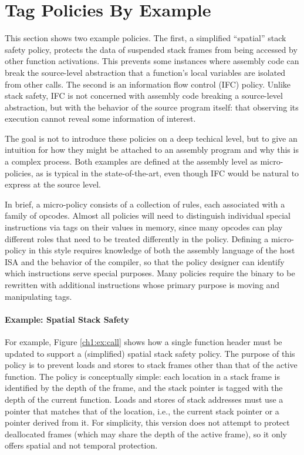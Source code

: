 \section{Tag Policies By Example}

This section shows two example policies. The first, a simplified ``spatial''
stack safety policy, protects the data of suspended stack frames from being accessed by
other function activations. This prevents some instances where assembly
code can break the source-level abstraction that a function's local variables are isolated
from other calls. The second is an information flow control (IFC) policy. Unlike stack safety,
IFC is not concerned with assembly code breaking a source-level abstraction, but with
the behavior of the source program itself: that observing its execution cannot reveal
some information of interest.

The goal is not to introduce these policies on a deep techical level, but to give an
intuition for how they might be attached to an assembly program and why this is a complex
process. Both examples are defined at the assembly level as micro-policies,
as is typical in the state-of-the-art, even though IFC would be natural to express at the
source level.

In brief, a micro-policy consists of a collection of rules, each associated with a family
of opcodes. Almost all policies will need to distinguish individual special instructions
via tags on their values in memory, since many opcodes can play different roles that need to be
treated differently in the policy. Defining a micro-policy in this style requires knowledge
of both the assembly language of the host ISA and the behavior of the compiler, so that the
policy designer can identify which instructions serve special purposes. Many policies require
the binary to be rewritten with additional instructions whose primary purpose is moving and
manipulating tags.

\paragraph{Example: Spatial Stack Safety}

For example, Figure \ref{ch1:ex:call} shows how a single function header must be updated to
support a (simplified) spatial stack safety policy. The purpose of this policy is to prevent
loads and stores to stack frames other than that of the active function.
The policy is conceptually simple:
each location in a stack frame is identified by the depth of the frame, and the stack pointer
is tagged with the depth of the current function.  Loads and stores of stack
addresses must use a pointer that matches that of the location, i.e., the current stack pointer
or a pointer derived from it. For simplicity, this version does not attempt to protect deallocated
frames (which may share the depth of the active frame), so it only offers spatial and not temporal
protection.

